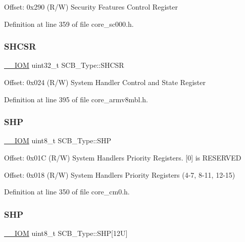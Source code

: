 Offset\+: 0x290 (R/W) Security Features Control Register 

Definition at line 359 of file core\+\_\+sc000.\+h.

\mbox{\label{struct_s_c_b___type_a7b5ae9741a99808043394c4743b635c4}} 
\subsubsection{\texorpdfstring{S\+H\+C\+SR}{SHCSR}}
{\footnotesize\ttfamily \hyperlink{core__sc300_8h_ab6caba5853a60a17e8e04499b52bf691}{\+\_\+\+\_\+\+I\+OM} uint32\+\_\+t S\+C\+B\+\_\+\+Type\+::\+S\+H\+C\+SR}

Offset\+: 0x024 (R/W) System Handler Control and State Register 

Definition at line 395 of file core\+\_\+armv8mbl.\+h.

\mbox{\label{struct_s_c_b___type_a5c40d124f95a3f7f431a3d5409d6ad28}} 
\subsubsection{\texorpdfstring{S\+HP}{SHP}\hspace{0.1cm}{\footnotesize\ttfamily [1/2]}}
{\footnotesize\ttfamily \hyperlink{core__sc300_8h_ab6caba5853a60a17e8e04499b52bf691}{\+\_\+\+\_\+\+I\+OM} uint8\+\_\+t S\+C\+B\+\_\+\+Type\+::\+S\+HP}

Offset\+: 0x01C (R/W) System Handlers Priority Registers. \mbox{[}0\mbox{]} is R\+E\+S\+E\+R\+V\+ED

Offset\+: 0x018 (R/W) System Handlers Priority Registers (4-\/7, 8-\/11, 12-\/15) 

Definition at line 350 of file core\+\_\+cm0.\+h.

\mbox{\label{struct_s_c_b___type_a9b05f74580fc93daa7fe2f0e1c9c5663}} 
\subsubsection{\texorpdfstring{S\+HP}{SHP}\hspace{0.1cm}{\footnotesize\ttfamily [2/2]}}
{\footnotesize\ttfamily \hyperlink{core__sc300_8h_ab6caba5853a60a17e8e04499b52bf691}{\+\_\+\+\_\+\+I\+OM} uint8\+\_\+t S\+C\+B\+\_\+\+Type\+::\+S\+HP\mbox{[}12\+U\mbox{]}}


